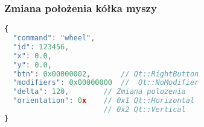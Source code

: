 \subsubsection{Zmiana położenia kółka myszy}
\begin{lstlisting}[language=JavaScript,numbers=none]
{
  "command": "wheel",
  "id": 123456,
  "x": 0.0,
  "y": 0.0,
  "btn": 0x00000002,       // Qt::RightButton
  "modifiers": 0x00000000  //  Qt::NoModifier
  "delta": 120,        // Zmiana polozenia
  "orientation": 0x    // 0x1 Qt::Horizontal
                       // 0x2 Qt::Vertical
}
\end{lstlisting} 
